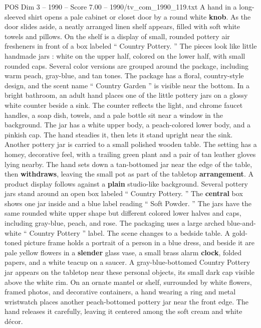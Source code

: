 \begin{textsample}{POS Dim 3 – 1990 – Score 7.00 – 1990/tv\_com\_1990\_119.txt}  \label{ex:f3_pos_053}
A hand in a long-sleeved shirt opens a pale cabinet or closet door by a round white \textbf{knob}.
As the door slides aside, a neatly arranged linen shelf appears, filled with soft white towels and pillows.
On the shelf is a display of small, rounded pottery air fresheners in front of a box labeled “ Country Pottery. ” The pieces look like little handmade jars : white on the upper half, colored on the lower half, with small rounded caps.
Several color versions are grouped around the package, including warm peach, gray-blue, and tan tones.
The package has a floral, country-style design, and the scent name “ Country Garden ” is visible near the bottom.
In a bright bathroom, an adult hand places one of the little pottery jars on a glossy white counter beside a sink.
The counter reflects the light, and chrome faucet handles, a soap dish, towels, and a pale bottle sit near a window in the background.
The jar has a white upper body, a peach-colored lower body, and a pinkish cap.
The hand steadies it, then lets it stand upright near the sink.
Another pottery jar is carried to a small polished wooden table.
The setting has a homey, decorative feel, with a trailing green plant and a pair of tan leather gloves lying nearby.
The hand sets down a tan-bottomed jar near the edge of the table, then \textbf{withdraws}, leaving the small pot as part of the tabletop \textbf{arrangement}.
A product display follows against a \textbf{plain} studio-like background.
Several pottery jars stand around an open box labeled “ Country Pottery. ” The \textbf{central} box shows one jar inside and a blue label reading “ Soft Powder. ” The jars have the same rounded white upper shape but different colored lower halves and caps, including gray-blue, peach, and rose.
The packaging uses a large arched blue-and-white “ Country Pottery ” label.
The scene changes to a bedside table.
A gold-toned picture frame holds a portrait of a person in a blue dress, and beside it are pale yellow flowers in a \textbf{slender} glass vase, a small brass alarm \textbf{clock}, folded papers, and a white teacup on a saucer.
A gray-blue-bottomed Country Pottery jar appears on the tabletop near these personal objects, its small dark cap visible above the white rim.
On an ornate mantel or shelf, surrounded by white flowers, framed photos, and decorative containers, a hand wearing a ring and metal wristwatch places another peach-bottomed pottery jar near the front edge.
The hand releases it carefully, leaving it centered among the soft cream and white décor.

\end{textsample}
